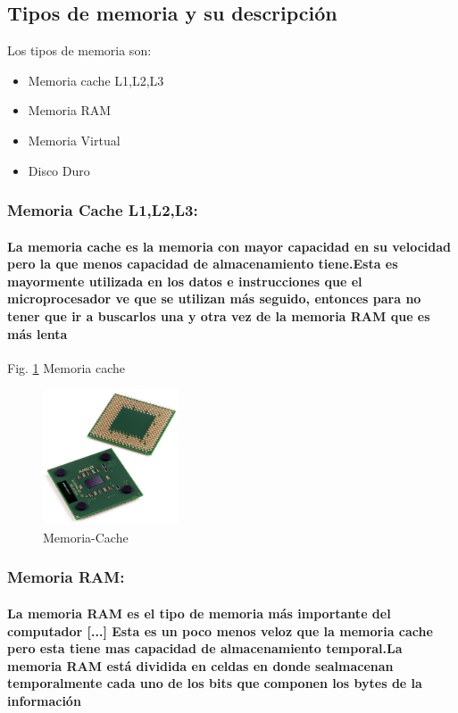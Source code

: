 \documentclass{article}
\begin{document}
\subsection{Tipos de memoria y su descripción}

Los tipos de memoria son:
\begin{itemize}
    \item Memoria cache L1,L2,L3
    \item Memoria RAM
    \item Memoria Virtual
    \item Disco Duro
\end{itemize}

\subsubsection{Memoria Cache L1,L2,L3:}

\paragraph{La memoria cache es la memoria con mayor capacidad en su velocidad pero la que menos capacidad de almacenamiento tiene.Esta es mayormente utilizada en los datos e instrucciones que el microprocesador
ve que se utilizan más seguido, entonces para no tener que ir a buscarlos una y otra vez de la
memoria RAM que es más lenta\cite{taller}}

Fig. \ref{fig:Memoria-Cache} Memoria cache
    \begin{figure}[h]
    \includegraphics[width=4cm]{Memoria-Cache.jpg}
    \centering
    \caption{Memoria-Cache}
    \label{fig:Memoria-Cache}
    \end{figure}

\subsubsection{Memoria RAM:}

\paragraph{La memoria RAM es el tipo de memoria más importante del computador [...] Esta es un poco menos veloz que la memoria cache pero esta tiene mas capacidad de almacenamiento temporal.La memoria RAM está dividida en celdas en donde sealmacenan temporalmente cada uno de los bits que componen los bytes de la información \cite{taller}}
\end{document}
